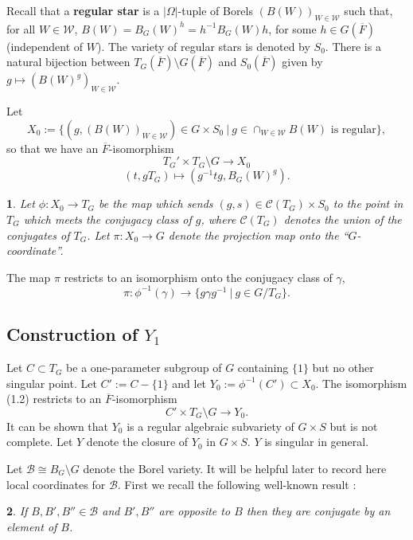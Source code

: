 \documentclass[12pt,letterpaper]{amsart}
\newcommand{\ovF}{\overline{F}}
\newcommand{\proclaimname}{}
\newtheorem*{proclaimx}{\proclaimname}
\newenvironment{proclaim}[1]%
  {\renewcommand{\proclaimname}{#1}\begin{proclaimx}}{\end{proclaimx}}
\begin{document}
Recall that a \textbf{regular star} is a $|\Omega|$-tuple of Borels
$(B(W))_{W\in {\mathcal W}}$ such that, for all $W\in {\mathcal W}$,
$B(W)={B}_G(W)^h=h^{-1}{B}_G(W)h$, for some
$h\in G(\overline{F})$ (independent of $W$).
The variety of regular stars is denoted by $S_0$.
There is a natural bijection between $T_G(\ovF)\setminus G(\ovF)$
and $S_0(\ovF)$ given by $g\longmapsto (B(W)^g)_{W\in {\mathcal W}}$.

Let
\[
X_0:=\{(g,(B(W))_{W\in {\mathcal W}})\in G\times S_0\ |\
g\in\cap_{W\in {\mathcal W}}B(W)\text{ is regular}\},
\tag{1.1}
\]
so that we have an $\overline{F}$-isomorphism
\[
T_G'\times T_G\setminus G
\rightarrow X_0
\tag{1.2}
\]
\[
(t,gT_G)\longmapsto (g^{-1}tg,{B}_G(W)^g).
\]

\begin{proclaim}{Definition} Let
$\phi:X_0\rightarrow T_G$ be the map which sends
$(g,s)\in {\mathcal C}(T_G)\times S_0$ to the point in $T_G$ which meets the
conjugacy class of $g$, where ${\mathcal C}(T_G)$ denotes the
union of the conjugates of $T_G$.
Let $\pi :X_0\rightarrow G$ denote the projection map onto
the ``$G$-coordinate''.
\end{proclaim}

The map $\pi$ restricts to an isomorphism onto the
conjugacy class of $\gamma$,
\[
\pi:\phi^{-1}(\gamma)\rightarrow \{g\gamma g^{-1}\ |\ g\in G/T_G\}.
\]

\subsection*{Construction of $Y_1$}

Let $C\subset T_G$ be a one-parameter subgroup of $G$
containing $\{1\}$ but no other singular point.
Let $C':=C-\{1\}$
and let $Y_0:=\phi^{-1}(C')\subset X_0$. The isomorphism
(1.2) restricts to an $\overline{F}$-isomorphism
\[
C'\times T_G\setminus G\rightarrow Y_0.
\tag{1.4}
\]
It can be shown that $Y_0$ is a regular algebraic subvariety of $G\times S$
\cite[p.\ 480]{La83} but is not complete.
Let $Y$ denote the closure of $Y_0$ in $G\times S$. $Y$ is
singular in general.

Let ${\mathcal B}\cong B_G\setminus G$ denote the Borel variety.
It will be helpful
later to record here local coordinates for ${\mathcal B}$.
First we recall the following
well-known result \cite[ch IV, Corollary 14.13]{Bor91}:

\begin{proclaim}{Lemma 1.5} If $B,B',B''\in {\mathcal B}$ and $B', B''$ are opposite
to $B$ then they are conjugate by an element of $B$.
\end{proclaim}
\end{document}
